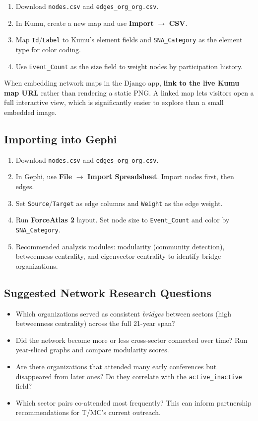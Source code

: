 \documentclass[12pt]{article}
\begin{document}
\begin{enumerate}[leftmargin=1.5em]
  \item Download \texttt{nodes.csv} and \texttt{edges\_org\_org.csv}.
  \item In Kumu, create a new map and use \textbf{Import} $\to$ \textbf{CSV}.
  \item Map \texttt{Id}/\texttt{Label} to Kumu's element fields and
        \texttt{SNA\_Category} as the element type for color coding.
  \item Use \texttt{Event\_Count} as the size field to weight nodes by
        participation history.
\end{enumerate}

When embedding network maps in the Django app, \textbf{link to the live Kumu
map URL} rather than rendering a static PNG. A linked map lets visitors open
a full interactive view, which is significantly easier to explore than a small
embedded image.

\subsection{Importing into Gephi}

\begin{enumerate}[leftmargin=1.5em]
  \item Download \texttt{nodes.csv} and \texttt{edges\_org\_org.csv}.
  \item In Gephi, use \textbf{File} $\to$ \textbf{Import Spreadsheet}.
        Import nodes first, then edges.
  \item Set \texttt{Source}/\texttt{Target} as edge columns and
        \texttt{Weight} as the edge weight.
  \item Run \textbf{ForceAtlas 2} layout. Set node size to
        \texttt{Event\_Count} and color by \texttt{SNA\_Category}.
  \item Recommended analysis modules: modularity (community detection),
        betweenness centrality, and eigenvector centrality to identify
        bridge organizations.
\end{enumerate}

\subsection{Suggested Network Research Questions}

\begin{itemize}[leftmargin=1.5em]
  \item Which organizations served as consistent \emph{bridges} between
        sectors (high betweenness centrality) across the full 21-year span?
  \item Did the network become more or less cross-sector connected over time?
        Run year-sliced graphs and compare modularity scores.
  \item Are there organizations that attended many early conferences but
        disappeared from later ones? Do they correlate with the
        \texttt{active\_inactive} field?
  \item Which sector pairs co-attended most frequently? This can inform
        partnership recommendations for T/MC's current outreach.
\end{itemize}
\end{document}
